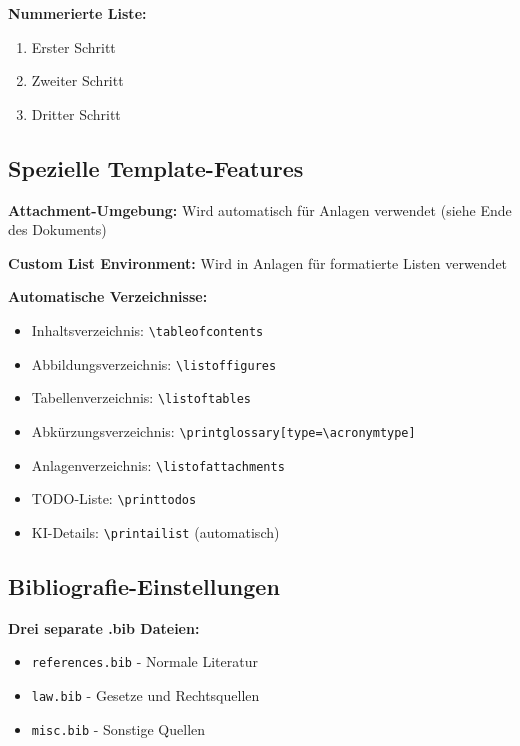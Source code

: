 \documentclass[../main.tex]{subfiles}
\begin{document}
\textbf{Nummerierte Liste:}
\begin{enumerate}
    \item Erster Schritt
    \item Zweiter Schritt
    \item Dritter Schritt
\end{enumerate}


\subsection{Spezielle Template-Features}

\textbf{Attachment-Umgebung:}
Wird automatisch für Anlagen verwendet (siehe Ende des Dokuments)

\textbf{Custom List Environment:}
Wird in Anlagen für formatierte Listen verwendet

\textbf{Automatische Verzeichnisse:}
\begin{itemize}
    \item Inhaltsverzeichnis: \verb|\tableofcontents|
    \item Abbildungsverzeichnis: \verb|\listoffigures|
    \item Tabellenverzeichnis: \verb|\listoftables|
    \item Abkürzungsverzeichnis: \verb|\printglossary[type=\acronymtype]|
    \item Anlagenverzeichnis: \verb|\listofattachments|
    \item TODO-Liste: \verb|\printtodos|
    \item KI-Details: \verb|\printailist| (automatisch)
\end{itemize}


\subsection{Bibliografie-Einstellungen}

\textbf{Drei separate .bib Dateien:}
\begin{itemize}
    \item \verb|references.bib| - Normale Literatur
    \item \verb|law.bib| - Gesetze und Rechtsquellen  
    \item \verb|misc.bib| - Sonstige Quellen
\end{itemize}
\end{document}
